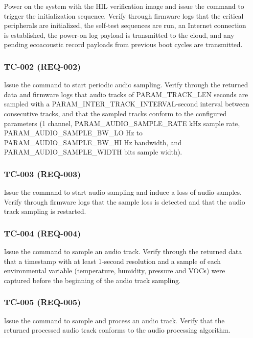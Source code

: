 \documentclass[11pt,a4paper]{article}
\begin{document}
Power on the system with the HIL verification image and issue the command to
trigger the initialization sequence. Verify through firmware logs that the
critical peripherals are initialized, the self-test sequences are run, an
Internet connection is established, the power-on log payload is transmitted to
the cloud, and any pending ecoacoustic record payloads from previous boot
cycles are transmitted.

\subsubsection{TC-002 (REQ-002)}

Issue the command to start periodic audio sampling. Verify through the returned
data and firmware logs that audio tracks of PARAM\_TRACK\_LEN seconds are
sampled with a PARAM\_INTER\_TRACK\_INTERVAL-second interval between consecutive
tracks, and that the sampled tracks conform to the configured parameters (1
channel, PARAM\_AUDIO\_SAMPLE\_RATE kHz sample rate, PARAM\_AUDIO\_SAMPLE\_BW\_LO
Hz to PARAM\_AUDIO\_SAMPLE\_BW\_HI Hz bandwidth, and PARAM\_AUDIO\_SAMPLE\_WIDTH
bits sample width).

\subsubsection{TC-003 (REQ-003)}

Issue the command to start audio sampling and induce a loss of audio samples.
Verify through firmware logs that the sample loss is detected and that the audio
track sampling is restarted.

\subsubsection{TC-004 (REQ-004)}

Issue the command to sample an audio track. Verify through the returned data
that a timestamp with at least 1-second resolution and a sample
of each environmental variable (temperature, humidity, pressure and VOCs) were
captured before the beginning of the audio track sampling.

\subsubsection{TC-005 (REQ-005)}

Issue the command to sample and process an audio track. Verify that the returned
processed audio track conforms to the audio processing algorithm.
\end{document}
